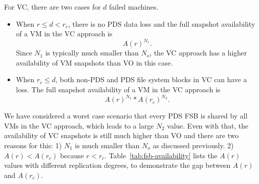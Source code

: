 For VC, there are two cases for $d$ failed machines.
\begin{itemize}
\item
When $r \le d<r_c$,  there is no PDS data loss and  
the full snapshot availability of a VM in the VC approach is 
\[
A(r)^{N_1}.
\]
Since $N_1$ is typically much smaller than $N_o$, 
the VC approach has a higher availability of VM snapshots than VO in this case.

\item
When $r_c \leq d$, both non-PDS and PDS file system blocks in VC can have a loss.
The full snapshot availability of  a VM in the VC approach is
\[
A(r)^{N_1} * A(r_c)^{N_2}.
\]
\end{itemize} 
We have considered a worst case scenario that
every PDS FSB is shared by all VMs in the VC approach, which leads to a large $N_2$ value. 
Even with that, the availability of VC snapshots is still much higher than VO and  
there are two reasons for this:  1) $N_1$ is much smaller than $N_o$ as discussed previously.
2)  $A(r) < A(r_c)$ because $r < r_c$.  
Table~\ref{tab:fsb-availability} lists the $A(r)$ values with
different replication degrees, to demonstrate the gap between  $A(r)$ and  $A(r_c)$.


